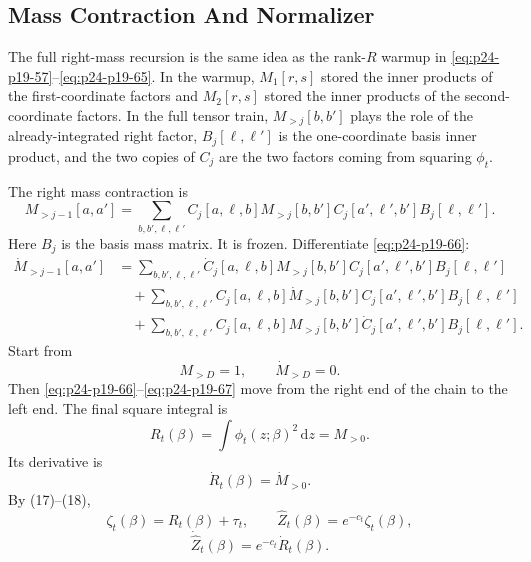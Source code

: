 \documentclass[11pt]{article}
\numberwithin{equation}{section}
\newcommand{\dd}{\,\mathrm d}
\begin{document}
\subsection{Mass Contraction And Normalizer}

The full right-mass recursion is the same idea as the rank-\(R\) warmup in
\eqref{eq:p24-p19-57}--\eqref{eq:p24-p19-65}.  In the warmup, \(M_1[r,s]\) stored the inner products of the
first-coordinate factors and \(M_2[r,s]\) stored the inner products of the
second-coordinate factors.  In the full tensor train, \(M_{>j}[b,b']\) plays
the role of the already-integrated right factor, \(B_j[\ell,\ell']\) is the
one-coordinate basis inner product, and the two copies of \(C_j\) are the two
factors coming from squaring \(\phi_t\).

The right mass contraction is
\begin{equation}
    M_{>j-1}[a,a']
    =
    \sum_{b,b',\ell,\ell'}
    C_j[a,\ell,b]
    M_{>j}[b,b']
    C_j[a',\ell',b']
    B_j[\ell,\ell'].
    \label{eq:p24-p19-66}
\end{equation}
Here \(B_j\) is the basis mass matrix.  It is frozen.  Differentiate \eqref{eq:p24-p19-66}:
\begin{equation}
\begin{aligned}
    \dot M_{>j-1}[a,a']
    &=
    \sum_{b,b',\ell,\ell'}
    \dot C_j[a,\ell,b]
    M_{>j}[b,b']
    C_j[a',\ell',b']
    B_j[\ell,\ell']\\
    &\quad+
    \sum_{b,b',\ell,\ell'}
    C_j[a,\ell,b]
    \dot M_{>j}[b,b']
    C_j[a',\ell',b']
    B_j[\ell,\ell']\\
    &\quad+
    \sum_{b,b',\ell,\ell'}
    C_j[a,\ell,b]
    M_{>j}[b,b']
    \dot C_j[a',\ell',b']
    B_j[\ell,\ell'].
\end{aligned}
\label{eq:p24-p19-67}
\end{equation}
Start from
\begin{equation}
    M_{>D}=1,
    \qquad
    \dot M_{>D}=0.
    \label{eq:p24-p19-68}
\end{equation}
Then \eqref{eq:p24-p19-66}--\eqref{eq:p24-p19-67} move from the right end of the chain to the left end.  The
final square integral is
\begin{equation}
    R_t(\beta)=\int\phi_t(z;\beta)^2\dd z=M_{>0}.
    \label{eq:p24-p19-69}
\end{equation}
Its derivative is
\begin{equation}
    \dot R_t(\beta)=\dot M_{>0}.
    \label{eq:p24-p19-70}
\end{equation}
By (17)--(18),
\begin{equation}
    \zeta_t(\beta)=R_t(\beta)+\tau_t,
    \qquad
    \widehat Z_t(\beta)=e^{-c_t}\zeta_t(\beta),
    \label{eq:p24-p19-71}
\end{equation}
\begin{equation}
    \dot{\widehat Z}_t(\beta)=e^{-c_t}\dot R_t(\beta).
    \label{eq:p24-p19-72}
\end{equation}
\end{document}
